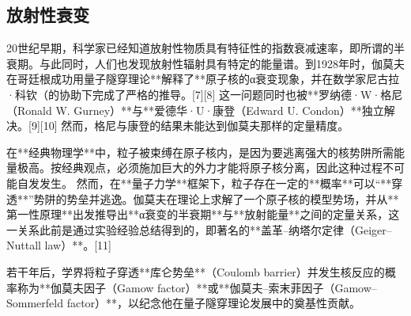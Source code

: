 \subsection{放射性衰变}
20世纪早期，科学家已经知道放射性物质具有特征性的指数衰减速率，即所谓的半衰期。与此同时，人们也发现放射性辐射具有特定的能量谱。到1928年时，伽莫夫在哥廷根成功用量子隧穿理论**解释了**原子核的α衰变现象，并在数学家尼古拉·科钦（的协助下完成了严格的推导。[7][8] 这一问题同时也被**罗纳德·W·格尼（Ronald W. Gurney）**与**爱德华·U·康登（Edward U. Condon）**独立解决。[9][10] 然而，格尼与康登的结果未能达到伽莫夫那样的定量精度。

在**经典物理学**中，粒子被束缚在原子核内，是因为要逃离强大的核势阱所需能量极高。按经典观点，必须施加巨大的外力才能将原子核分离，因此这种过程不可能自发发生。
然而，在**量子力学**框架下，粒子存在一定的**概率**可以“**穿透**”势阱的势垒并逃逸。伽莫夫在理论上求解了一个原子核的模型势场，并从**第一性原理**出发推导出**α衰变的半衰期**与**放射能量**之间的定量关系，这一关系此前是通过实验经验总结得到的，即著名的**盖革–纳塔尔定律（Geiger–Nuttall law）**。[11]

若干年后，学界将粒子穿透**库仑势垒**（Coulomb barrier）并发生核反应的概率称为**伽莫夫因子（Gamow factor）**或**伽莫夫–索末菲因子（Gamow–Sommerfeld factor）**，以纪念他在量子隧穿理论发展中的奠基性贡献。
